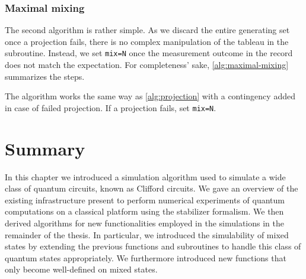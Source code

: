 \subsubsection{Maximal mixing}
The second algorithm is rather simple. As we discard the entire generating set
once a projection fails, there is no complex manipulation of the tableau in the
subroutine. Instead, we set \verb|mix=N| once the measurement outcome in the
record does not match the expectation. For completeness' sake,
\cref{alg:maximal-mixing} summarizes the steps.

\begin{alg}\label{alg:maximal-mixing}
  The algorithm works the same way as \cref{alg:projection} with a contingency
  added in case of failed projection. If a projection fails, set \verb|mix=N|.
\end{alg}

\section{Summary}

In this chapter we introduced a simulation algorithm used to simulate a wide
class of quantum circuits, known as Clifford circuits. We gave an overview of
the existing infrastructure present to perform numerical experiments of quantum
computations on a classical platform using the stabilizer formalism. We then
derived algorithms for new functionalities employed in the simulations in the
remainder of the thesis. In particular, we introduced the simulability of mixed
states by extending the previous functions and subroutines to handle this class
of quantum states appropriately. We furthermore introduced new functions that
only become well-defined on mixed states.

%  
